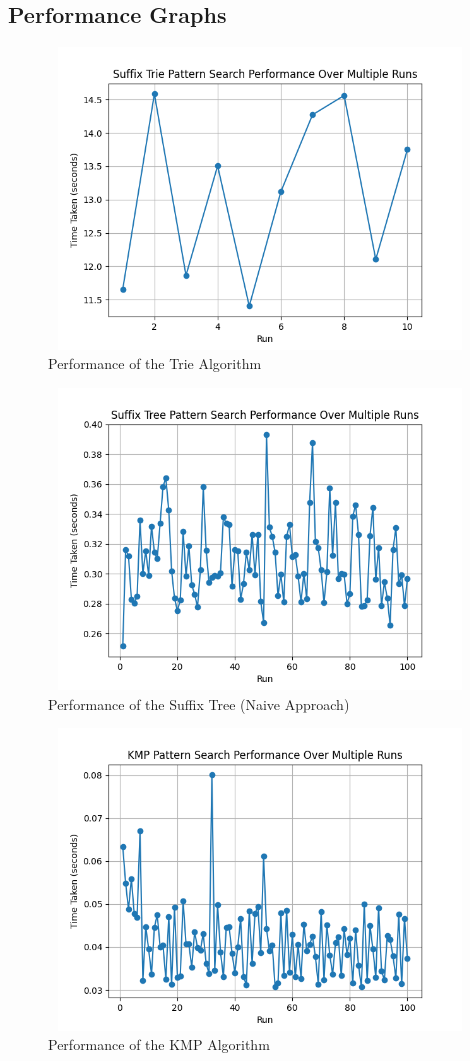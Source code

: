 \documentclass[11pt,a4paper]{article}
\begin{document}
\subsection{Performance Graphs}
\begin{figure}[H]
    \centering
    \includegraphics[width=12cm, height=8cm]{time_trie.png}
    \caption{Performance of the Trie Algorithm}
\end{figure}

\begin{figure}[H]
    \centering
    \includegraphics[width=12cm, height=8cm]{time_Naive.png}
    \caption{Performance of the Suffix Tree (Naive Approach)}
\end{figure}

\begin{figure}[H]
    \centering
    \includegraphics[width=12cm, height=8cm]{time_KMP.png}
    \caption{Performance of the KMP Algorithm}
\end{figure}
\end{document}
